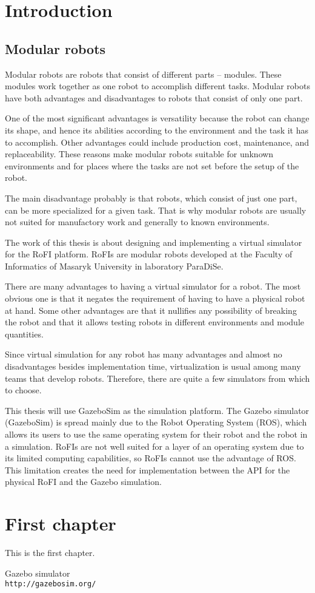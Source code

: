 \documentclass[
  digital, %
  table,   %
  twoside, %
  lof,     %
  lot,     %
]{fithesis3}
\begin{document}
\chapter{Introduction}

\section{Modular robots}

Modular robots are robots that consist of different parts -- modules.
These modules work together as one robot to accomplish different tasks.
Modular robots have both advantages and disadvantages to robots that consist of only one part.

One of the most significant advantages is versatility because the robot can change its shape, and hence its abilities according to the environment and the task it has to accomplish.
Other advantages could include production cost, maintenance, and replaceability.
These reasons make modular robots suitable for unknown environments and for places where the tasks are not set before the setup of the robot.

The main disadvantage probably is that robots, which consist of just one part, can be more specialized for a given task.
That is why modular robots are usually not suited for manufactory work and generally to known environments.

The work of this thesis is about designing and implementing a virtual simulator for the RoFI platform. RoFIs are modular robots developed at the Faculty of Informatics of Masaryk University in laboratory ParaDiSe.

There are many advantages to having a virtual simulator for a robot.
The most obvious one is that it negates the requirement of having to have a physical robot at hand.
Some other advantages are that it nullifies any possibility of breaking the robot and that it allows testing robots in different environments and module quantities.

Since virtual simulation for any robot has many advantages and almost no disadvantages besides implementation time, virtualization is usual among many teams that develop robots.
Therefore, there are quite a few simulators from which to choose.

This thesis will use GazeboSim as the simulation platform.
The Gazebo simulator (GazeboSim) is spread mainly due to the Robot Operating System (ROS), which allows its users to use the same operating system for their robot and the robot in a simulation.
RoFIs are not well suited for a layer of an operating system due to its limited computing capabilities, so RoFIs cannot use the advantage of ROS.
This limitation creates the need for implementation between the API for the physical RoFI and the Gazebo simulation.


\chapter{First chapter}

This is the first chapter.

\begin{thebibliography}{9}

Gazebo simulator
\\
\texttt{http://gazebosim.org/}

\end{thebibliography}
\end{document}
